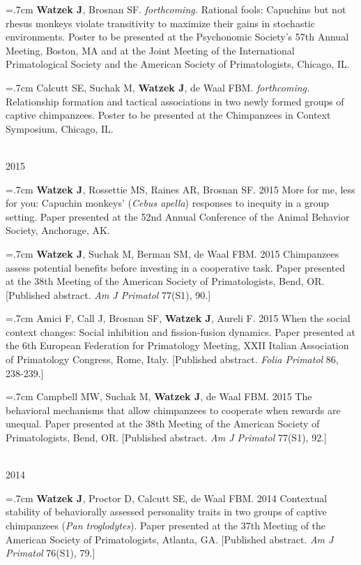 \documentclass[]{friggeri-cv}
\begin{document}
\hangindent=.7cm \textbf{Watzek J}, Brosnan SF. \emph{forthcoming.} Rational fools: Capuchins but not rhesus monkeys violate transitivity to maximize their gains in stochastic environments. Poster to be presented at the Psychonomic Society's 57th Annual Meeting, Boston, MA and at the Joint Meeting of the International Primatological Society and the American Society of Primatologists, Chicago, IL.

\hangindent=.7cm Calcutt SE, Suchak M, \textbf{Watzek J}, de Waal FBM. \emph{forthcoming.} Relationship formation and tactical associations in two newly formed groups of captive chimpanzees. Poster to be presented at the Chimpanzees in Context Symposium, Chicago, IL.


{\large{} ~\\ 2015}

\hangindent=.7cm \textbf{Watzek J}, Rossettie MS, Raines AR, Brosnan SF. 2015 More for me, less for you: Capuchin monkeys' (\emph{Cebus apella}) responses to inequity in a group setting. Paper presented at the 52nd Annual Conference of the Animal Behavior Society, Anchorage, AK.

\hangindent=.7cm \textbf{Watzek J}, Suchak M, Berman SM, de Waal FBM. 2015 Chimpanzees assess potential benefits before investing in a cooperative task. Paper presented at the 38th Meeting of the American Society of Primatologists, Bend, OR. [Published abstract. \emph{Am J Primatol} 77(S1), 90.]

\hangindent=.7cm Amici F, Call J, Brosnan SF, \textbf{Watzek J}, Aureli F. 2015 When the social context changes: Social inhibition and fission-fusion dynamics. Paper presented at the 6th European Federation for Primatology Meeting, XXII Italian Association of Primatology Congress, Rome, Italy. [Published abstract. \emph{Folia Primatol} 86, 238-239.]

\hangindent=.7cm Campbell MW, Suchak M, \textbf{Watzek J}, de Waal FBM. 2015 The behavioral mechanisms that allow chimpanzees to cooperate when rewards are unequal. Paper presented at the 38th Meeting of the American Society of Primatologists, Bend, OR. [Published abstract. \emph{Am J Primatol} 77(S1), 92.]


{\large{} ~\\ 2014}

\hangindent=.7cm \textbf{Watzek J}, Proctor D, Calcutt SE, de Waal FBM. 2014 Contextual stability of behaviorally assessed personality traits in two groups of captive chimpanzees (\emph{Pan troglodytes}). Paper presented at the 37th Meeting of the American Society of Primatologists, Atlanta, GA. [Published abstract. \emph{Am J Primatol} 76(S1), 79.]
\end{document}
